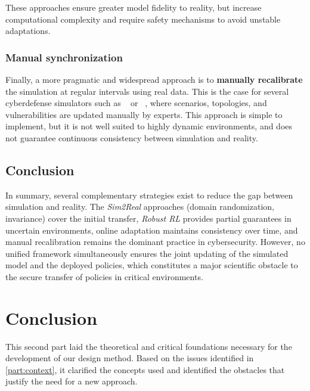         \noindent
        These approaches ensure greater model fidelity to reality,
        but increase computational complexity and require
        safety mechanisms to avoid unstable adaptations.

        \subsection{Manual synchronization}

        \noindent
        Finally, a more pragmatic and widespread approach is to
        \textbf{manually recalibrate} the simulation
        at regular intervals using real data.
        This is the case for several cyberdefense simulators such as
        ~\cite{Standen2021} or
        ~\cite{cyberbattlesim},
        where scenarios, topologies, and vulnerabilities are updated
        manually by experts.
        This approach is simple to implement,
        but it is not well suited to highly dynamic environments,
        and does not guarantee continuous consistency between simulation and reality.

        \section{Conclusion}
        \noindent
        In summary, several complementary strategies exist
        to reduce the gap between simulation and reality.
        The \textit{Sim2Real} approaches (domain randomization, invariance)
        cover the initial transfer,
        \textit{Robust RL} provides partial guarantees in uncertain environments,
        online adaptation maintains consistency over time,
        and manual recalibration remains the dominant practice in cybersecurity.
        However, no unified framework simultaneously ensures
        the joint updating of the simulated model and the deployed policies,
        which constitutes a major scientific obstacle to the secure transfer
        of  policies in critical environments.

        \clearpage
        \thispagestyle{empty}
        \null
        \newpage


        \chapter*{Conclusion}

        \noindent
        This second part laid the theoretical and critical foundations necessary for the development of our design method. Based on the issues identified in \autoref{part:context}, it clarified the concepts used and identified the obstacles that justify the need for a new approach.

